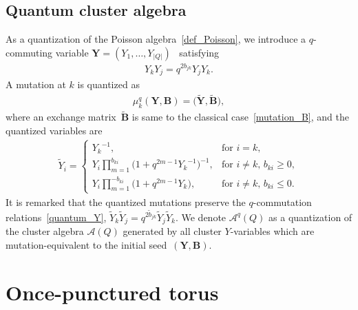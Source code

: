 \documentclass[10pt,a4paper]{amsart}
\numberwithin{equation}{section}
\begin{document}
\subsection{Quantum cluster algebra}
As a quantization of the Poisson algebra~\eqref{def_Poisson}, we introduce a $q$-commuting variable $\boldsymbol{Y}=(Y_1, \dots, Y_{|Q|})$~\cite{FockGonc09b, FockGonc09a} satisfying
\begin{gather} \label{quantum_Y}
 Y_k Y_j = q^{2 b_{jk}} Y_j Y_k .
\end{gather}
A mutation at $k$ is quantized as
\begin{gather*}
 \mu^q_k ( \boldsymbol{Y}, \mathbf{B}) = \big( \widetilde{\boldsymbol{Y}}, \widetilde{ \mathbf{B} }\big) ,
\end{gather*}
where
an exchange matrix~$\widetilde{\mathbf{B}}$ is same to the classical case~\eqref{mutation_B}, and the quantized variables are
\begin{gather*}
 \widetilde{Y}_i= \begin{cases}
 {Y_k}^{-1} , & \text{for $i=k$}, \\
 \displaystyle Y_i \prod_{m=1}^{b_{ki}} \big( 1+ q^{2m-1} {Y_k}^{-1} \big)^{-1} , & \text{for $i\neq k$, $b_{ki} \geq 0$}, \\
 \displaystyle Y_i \prod_{m=1}^{-b_{ki}} \big( 1 + q^{2m-1} Y_k \big) , & \text{for $i \neq k$, $b_{ki} \leq 0$}.
 \end{cases}
\end{gather*}
It is remarked that the quantized mutations preserve the $q$-commutation relations~\eqref{quantum_Y}, $\widetilde{Y}_k \widetilde{Y}_j=q^{2 \widetilde{b}_{jk}} \widetilde{Y}_j \widetilde{Y}_k$. We denote $\mathcal{A}^q(Q)$ as a quantization of the cluster algebra $\mathcal{A}(Q)$ generated by all cluster $Y$-variables which are mutation-equivalent to the initial seed~$(\boldsymbol{Y}, \mathbf{B})$.

\section{Once-punctured torus}\label{sec:torus}
\end{document}
